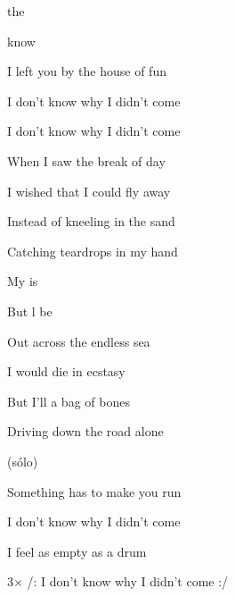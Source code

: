 
          

\zs
{}  the  

 know   

I left you by the house of fun

I don't know why I didn't come

I don't know why I didn't come
\ks

\zs
When I saw the break of day

I wished that I could fly away

Instead of kneeling in the sand

Catching teardrops in my hand
\ks

\zr
My  is   

But l be  
        
\kr

\zs
Out across the endless sea

I would die in ecstasy

But I'll a bag of bones

Driving down the road alone
\ks

\zr
\kr

\zs
(sólo)
\ks

\zs
Something has to make you run

I don't know why I didn't come

I feel as empty as a drum

3× /: I don't know why I didn't come :/
\ks

\kp
